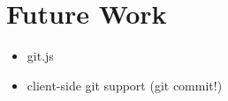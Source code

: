 \section{Future Work}
\label{sec:Related_Work}

\begin{itemize}
	\item git.js
	\item client-side git support (git commit!)
\end{itemize}